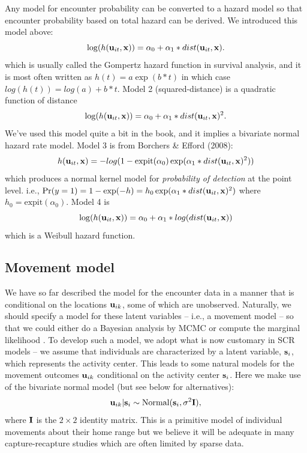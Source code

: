 Any model for encounter probability can be converted to a hazard model
so that encounter probability based on total hazard can be derived.
We introduced this model above:
\[
\log(h({\bf u}_{it},{\bf x})) = \alpha_{0} + \alpha_{1}*dist({\bf u}_{it},{\bf x}).
\]
which is usually called the Gompertz hazard function in survival
analysis, and it is most often written as $h(t) = a \exp( b*t)$ in which
case $log(h(t)) = log(a) + b*t$.  
Model 2 (squared-distance) is a
quadratic function of distance
\[
\log(h({\bf u}_{it},{\bf x})) = \alpha_{0} + \alpha_{1}*dist({\bf u}_{it},{\bf x})^2.
\]
We've used this model quite a bit in the book, and it implies a
bivariate normal hazard rate model. Model 3 is from Borchers \& Efford
(2008):
\[
h({\bf u}_{it},{\bf x} ) = -log(1 - \mbox{expit}(\alpha_{0})
\exp( \alpha_{1}*dist({\bf u}_{it},{\bf x})^2 ) )
\]
which produces a normal kernel model for {\it probability of
  detection} at the point level. i.e., $\Pr(y=1) = 1-\exp(-h) = h_{0}
\exp( \alpha_{1}*dist({\bf u}_{it},{\bf x})^2 )$ where $h_{0} =
\mbox{expit}(\alpha_{0})$.  
Model 4 is
\[
\log(h({\bf u}_{it},{\bf x})) = \alpha_{0} + \alpha_{1}*log(dist({\bf u}_{it},{\bf x}))
\]
which is a Weibull hazard function.



\subsection{Movement model}

We have so far described the model for the encounter data in a manner
that is conditional on the locations ${\bf u}_{ik}$, some of which are
unobserved. Naturally, we should specify a model for these latent
variables -- i.e., a movement model -- so that we could either do a Bayesian analysis by MCMC
\citep{royle_young:2008, royle_etal:2011} or compute the marginal likelihood
\citep{efford:2011}.
To develop such a model, we adopt
what is now customary in SCR models -- we
assume that individuals are characterized by a latent variable, ${\bf
  s}_{i}$, which represents the activity center.
This leads to some natural models
 for the movement outcomes
${\bf u}_{ik}$ conditional on the activity center
${\bf  s}_{i}$. Here we make use of the bivariate normal model (but
see below for alternatives):
\[
 {\bf u}_{ik} | {\bf s}_{i} \sim \mbox{Normal}({\bf s}_{i}, \sigma^{2}{\bf I}),
\]
where ${\bf I}$ is the $2\times 2$ identity matrix.  
This is a
primitive model of individual movements about their home range but we
believe it will be adequate in many capture-recapture studies which
are often limited by sparse data.

